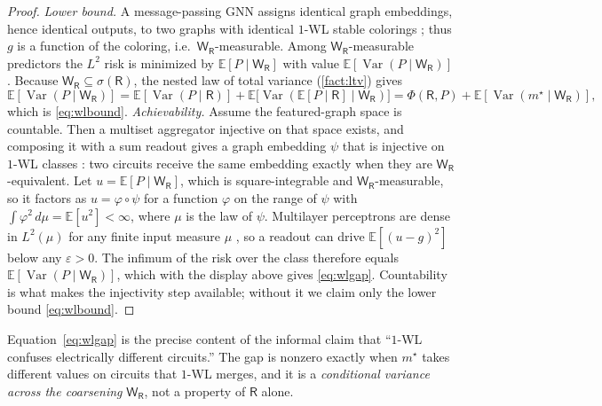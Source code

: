 \documentclass[10pt]{article}
\newcommand{\E}{\mathbb{E}}
\newcommand{\Var}{\operatorname{Var}}
\newcommand{\R}{\mathsf{R}}
\newcommand{\W}{\mathsf{W}}
\begin{document}
\begin{proof}
\emph{Lower bound.} A message-passing GNN assigns identical graph embeddings, hence identical outputs, to two graphs with identical $1$-WL stable colorings \citep{xu2019gin,morris2019wl}; thus $g$ is a function of the coloring, i.e.\ $\W_\R$-measurable. Among $\W_\R$-measurable predictors the $L^2$ risk is minimized by $\E[P\mid\W_\R]$ with value $\E[\Var(P\mid\W_\R)]$. Because $\W_\R\subseteq\sigma(\R)$, the nested law of total variance (\cref{fact:ltv}) gives
\[
\E[\Var(P\mid\W_\R)] = \E[\Var(P\mid\R)] + \E\!\big[\Var(\E[P\mid\R]\mid\W_\R)\big] = \Phi(\R,P) + \E[\Var(m^\star\mid\W_\R)],
\]
which is \cref{eq:wlbound}. \emph{Achievability.} Assume the featured-graph space is countable. Then a multiset aggregator injective on that space exists, and composing it with a sum readout gives a graph embedding $\psi$ that is injective on $1$-WL classes \citep{xu2019gin}: two circuits receive the same embedding exactly when they are $\W_\R$-equivalent. Let $u=\E[P\mid\W_\R]$, which is square-integrable and $\W_\R$-measurable, so it factors as $u=\varphi\circ\psi$ for a function $\varphi$ on the range of $\psi$ with $\int\varphi^2\,d\mu=\E[u^2]<\infty$, where $\mu$ is the law of $\psi$. Multilayer perceptrons are dense in $L^2(\mu)$ for any finite input measure $\mu$ \citep{hornik1991}, so a readout can drive $\E[(u-g)^2]$ below any $\varepsilon>0$. The infimum of the risk over the class therefore equals $\E[\Var(P\mid\W_\R)]$, which with the display above gives \cref{eq:wlgap}. Countability is what makes the injectivity step available; without it we claim only the lower bound \cref{eq:wlbound}.
\end{proof}

Equation~\eqref{eq:wlgap} is the precise content of the informal claim that ``$1$-WL confuses electrically different circuits.'' The gap is nonzero exactly when $m^\star$ takes different values on circuits that $1$-WL merges, and it is a \emph{conditional variance across the coarsening} $\W_\R$, not a property of $\R$ alone.
\end{document}
